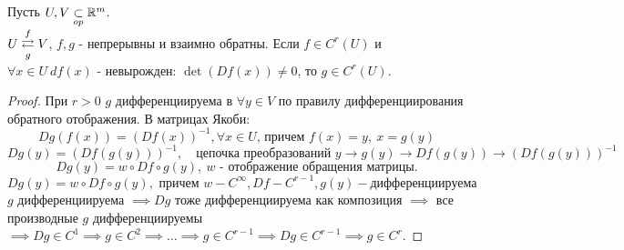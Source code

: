 \begin{theorem}
    Пусть $U, V \underset{op}{\subset} \mathbb{R}^m$. \\
    $U \overunderset{f}{g}{\rightleftarrows} V$, $f, g$ - непрерывны и взаимно обратны. Если $f \in C^r(U)$ и $\forall x \in U \ df(x)$ - невырожден: $\det(Df(x)) \neq 0$, то $g \in C^r(U)$.
    \begin{proof}
        При $r > 0$  $g$ дифференциируема в $\forall y \in V$ по правилу дифференциирования обратного отображения. В матрицах Якоби:
        \[Dg(f(x)) = (Df(x))^{-1}, \forall x \in U \text{, причем } f(x) = y, \ x = g(y)\]
        \[Dg(y) = (Df(g(y)))^{-1}, \quad \text{цепочка преобразований } y \to g(y) \to Df(g(y)) \to (Df(g(y)))^{-1}\]
        \[Dg(y) = w \circ Df \circ g(y), \ w \text{ - отображение обращения матрицы.}\]
        \[Dg(y) = w \circ Df \circ g(y), \text{ причем } w - C^{\infty}, Df - C^{r-1}, g(y) - \text{дифференциируема}\]
        $g$ дифференциируема $\implies Dg$ тоже дифференциируема как композиция $\implies$ все производные $g$ дифференциируемы $\implies Dg \in C^1 \implies g \in C^2 \implies \hdots \implies g \in C^{r-1} \implies Dg \in C^{r-1} \implies g \in C^r$.
    \end{proof} 
\end{theorem}

